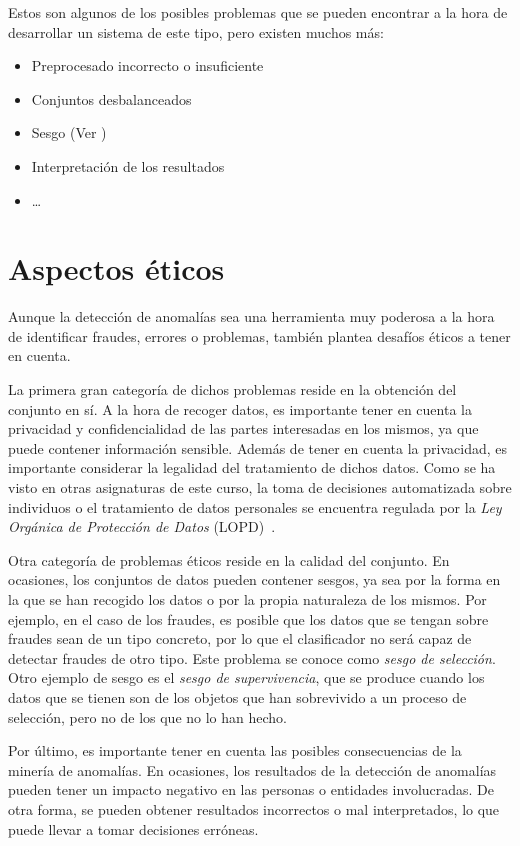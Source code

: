 \newpage{}
Estos son algunos de los posibles problemas que se pueden encontrar a la hora de desarrollar un sistema de
este tipo, pero existen muchos más:
\begin{itemize}
	\item Preprocesado incorrecto o insuficiente
	\item Conjuntos desbalanceados
	\item Sesgo (Ver )
	\item Interpretación de los resultados
	\item \ldots
\end{itemize}

\section{Aspectos éticos}\label{sec:etica}
Aunque la detección de anomalías sea una herramienta muy poderosa a la hora de identificar
fraudes, errores o problemas, también plantea desafíos éticos a tener en cuenta.

La primera gran categoría de dichos problemas reside en la obtención del conjunto en sí.
A la hora de recoger datos, es importante tener en cuenta la privacidad y confidencialidad
de las partes interesadas en los mismos, ya que puede contener información sensible. Además
de tener en cuenta la privacidad, es importante considerar la legalidad del tratamiento de
dichos datos. Como se ha visto en otras asignaturas de este curso, la toma de decisiones
automatizada sobre individuos o el tratamiento de datos personales se encuentra regulada
por la \textit{Ley Orgánica de Protección de Datos} (LOPD)~\cite{lopd}.

Otra categoría de problemas éticos reside en la calidad del conjunto. En ocasiones, los
conjuntos de datos pueden contener sesgos, ya sea por la forma en la que se han recogido
los datos o por la propia naturaleza de los mismos. Por ejemplo, en el caso de los fraudes,
es posible que los datos que se tengan sobre fraudes sean de un tipo concreto, por lo que
el clasificador no será capaz de detectar fraudes de otro tipo. Este problema se conoce
como \textit{sesgo de selección}. Otro ejemplo de sesgo es el \textit{sesgo de supervivencia},
que se produce cuando los datos que se tienen son de los objetos que han sobrevivido a un
proceso de selección, pero no de los que no lo han hecho.

Por último, es importante tener en cuenta las posibles consecuencias de la minería de
anomalías. En ocasiones, los resultados de la detección de anomalías pueden tener un
impacto negativo en las personas o entidades involucradas. De otra forma, se pueden
obtener resultados incorrectos o mal interpretados, lo que puede llevar a tomar decisiones
erróneas.
